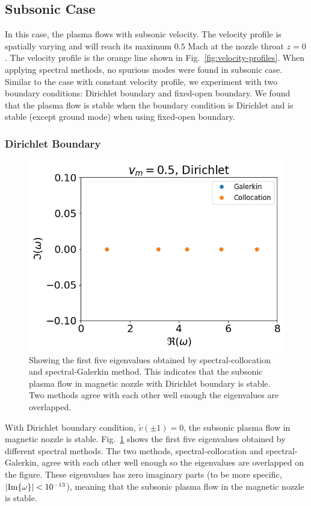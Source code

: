 \subsection{Subsonic Case}
In this case, the plasma flows with subsonic velocity. The velocity profile is spatially varying and will reach its maximum $0.5$ Mach at the nozzle throat $z=0$. The velocity profile is the orange line shown in Fig.~\ref{fig:velocity-profiles}. When applying spectral methods, no spurious modes were found in subsonic case. Similar to the case with constant velocity profile, we experiment with two boundary conditions: Dirichlet boundary and fixed-open boundary. We found that the plasma flow is stable when the boundary condition is Dirichlet and is stable (except ground mode) when using fixed-open boundary.

\subsubsection*{Dirichlet Boundary}
\begin{figure} [htbp!]
	\centering
	\includegraphics[width=0.7\linewidth]{figures/subsonic-drichlet.png}
	\caption{Showing the first five eigenvalues obtained by spectral-collocation and spectral-Galerkin method. This indicates that the subsonic plasma flow in magnetic nozzle with Dirichlet boundary is stable. Two methods agree with each other well enough the eigenvalues are overlapped.}
	\label{fig:subsonic-dirichlet}
\end{figure}
With Dirichlet boundary condition, $\tilde{v}(\pm 1) =0$, the subsonic plasma flow in magnetic nozzle is stable. Fig.~\ref{fig:subsonic-dirichlet} shows the first five eigenvalues obtained by different spectral methods. The two methods, spectral-collocation and spectral-Galerkin, agree with each other well enough so the eigenvalues are overlapped on the figure. These eigenvalues has zero imaginary parts (to be more specific, $\abs{\Im{\omega}} < 10^{-13}$), meaning that the subsonic plasma flow in the magnetic nozzle is stable.

